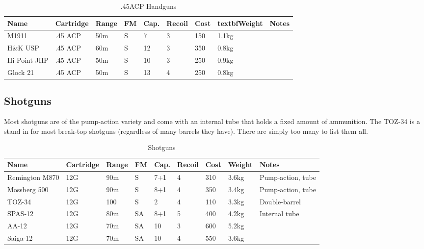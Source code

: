 \begin{table}
  \caption{.45ACP Handguns}
  \label{tab:Handguns45}
  \begin{center}
    \begin{tabular}{| l | l | l | l | l | l | l | l | l |}
      \hline
      \textbf{Name} & \textbf{Cartridge} & \textbf{Range} &
      \textbf{FM} & \textbf{Cap.} & \textbf{Recoil} &
      \textbf{Cost} & textbf{Weight} & \textbf{Notes} \\ \hline

      M1911        & .45 ACP & 50m & S &  7 & 3  & 150 & 1.1kg & \\ \hline
      H\&K USP     & .45 ACP & 60m & S & 12 & 3  & 350 & 0.8kg & \\ \hline
      Hi-Point JHP & .45 ACP & 50m & S & 10 & 3  & 250 & 0.9kg & \\ \hline
      Glock 21     & .45 ACP & 50m & S & 13 & 4  & 250 & 0.8kg & \\ \hline

    \end{tabular}
  \end{center}
\end{table}

\subsection{Shotguns}

Most shotguns are of the pump-action variety and come with an internal tube that
holds a fixed amount of ammunition. The TOZ-34 is a stand in for most break-top
shotguns (regardless of many barrels they have). There are simply too many to
list them all.

\begin{table}
  \label{tab:Shotguns}
  \caption{Shotguns}
  \begin{center}
    \begin{tabular}{| l | l | l | l | l | l | l | l | l |}
      \hline
      \textbf{Name} & \textbf{Cartridge} & \textbf{Range} &
      \textbf{FM} & \textbf{Cap.} & \textbf{Recoil} &
      \textbf{Cost} & \textbf{Weight} & \textbf{Notes} \\ \hline

      Remington M870 & 12G & 90m & S  & 7+1 & 4 & 310 & 3.6kg & Pump-action, tube \\ \hline
      Mossberg 500   & 12G & 90m & S  & 8+1 & 4 & 350 & 3.4kg & Pump-action, tube \\ \hline
      TOZ-34         & 12G & 100 & S  & 2   & 4 & 110 & 3.3kg & Double-barrel \\ \hline
      SPAS-12        & 12G & 80m & SA & 8+1 & 5 & 400 & 4.2kg & Internal tube \\ \hline
      AA-12          & 12G & 70m & SA & 10  & 3 & 600 & 5.2kg & \\ \hline
      Saiga-12       & 12G & 70m & SA & 10  & 4 & 550 & 3.6kg & \\ \hline

    \end{tabular}
  \end{center}
\end{table}

